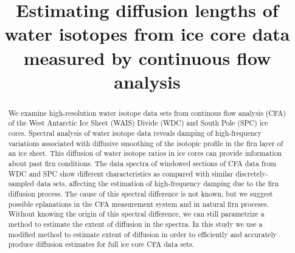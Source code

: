 \documentclass[draft, jgrga]{AGUTeX}
\begin{document}

\title{Estimating diffusion lengths of water isotopes from ice core data measured by continuous flow analysis}









\begin{abstract}

We examine high-resolution water isotope data sets from continous flow analysis (CFA) of the West Antarctic Ice Sheet (WAIS) Divide (WDC) and South Pole (SPC) ice cores. Spectral analysis of water isotope data reveals damping of high-frequency variations associated with diffusive smoothing of the isotopic profile in the firn layer of an ice sheet. This diffusion of water isotope ratios in ice cores can provide information about past firn conditions. The data spectra of windowed sections of CFA data from WDC and SPC show different characteristics as compared with similar discretely-sampled data sets, affecting the estimation of high-frequency damping due to the firn diffusion process. The cause of this spectral difference is not known, but we suggest possible eplanations in the CFA measurement system and in natural firn proceses. Without knowing the origin of this spectral difference, we can still parametrize a method to estimate the extent of diffusion in the spectra. In this study we use a modified method to estimate extent of diffusion in order to efficiently and accurately produce diffusion estimates for full ice core CFA data sets.

\end{abstract}
\end{document}
